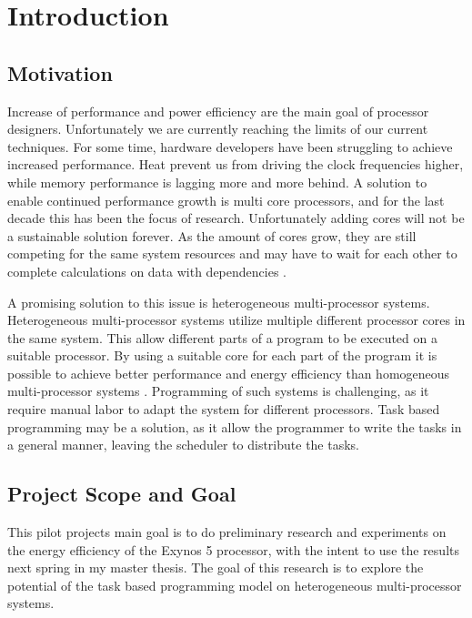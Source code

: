 \chapter[Introduction]{Introduction}
\section{Motivation}
Increase of performance and power efficiency are the main goal of processor designers.
Unfortunately we are currently reaching the limits of our current techniques.
For some time, hardware developers have been struggling to achieve increased performance.
Heat prevent us from driving the clock frequencies higher, while memory performance is lagging more and more behind.
A solution to enable continued performance growth is multi core processors, and for the last decade this has been the focus of research.
Unfortunately adding cores will not be a sustainable solution forever.
As the amount of cores grow, they are still competing for the same system resources and may have to wait for each other to complete calculations on data with dependencies \cite{hill07}.

A promising solution to this issue is heterogeneous multi-processor systems.
Heterogeneous multi-processor systems utilize multiple different processor cores in the same system.
This allow different parts of a program to be executed on a suitable processor.
By using a suitable core for each part of the program it is possible to achieve better performance and energy efficiency than homogeneous multi-processor systems \cite{kumar03}.
Programming of such systems is challenging, as it require manual labor to adapt the system for different processors. 
Task based programming may be a solution, as it allow the programmer to write the tasks in a general manner, leaving the scheduler to distribute the tasks.

\section{Project Scope and Goal}
This pilot projects main goal is to do preliminary research and experiments on the energy efficiency of the Exynos 5 processor, with the intent to use the results next spring in my master thesis.
The goal of this research is to explore the potential of the task based programming model on heterogeneous multi-processor systems.


